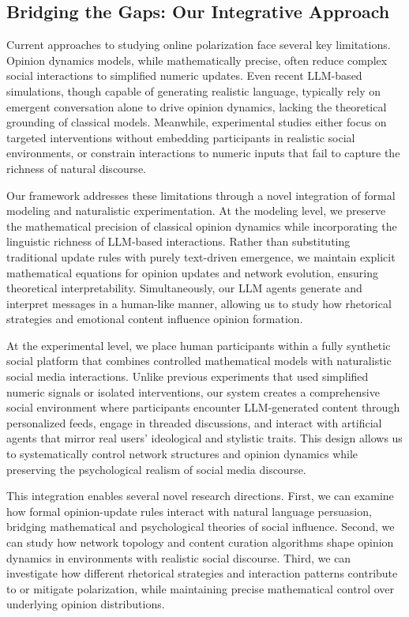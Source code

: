 \subsection{Bridging the Gaps: Our Integrative Approach}

Current approaches to studying online polarization face several key limitations. Opinion dynamics models, while mathematically precise, often reduce complex social interactions to simplified numeric updates. Even recent LLM-based simulations, though capable of generating realistic language, typically rely on emergent conversation alone to drive opinion dynamics, lacking the theoretical grounding of classical models. Meanwhile, experimental studies either focus on targeted interventions without embedding participants in realistic social environments, or constrain interactions to numeric inputs that fail to capture the richness of natural discourse.

Our framework addresses these limitations through a novel integration of formal modeling and naturalistic experimentation. At the modeling level, we preserve the mathematical precision of classical opinion dynamics while incorporating the linguistic richness of LLM-based interactions. Rather than substituting traditional update rules with purely text-driven emergence, we maintain explicit mathematical equations for opinion updates and network evolution, ensuring theoretical interpretability. Simultaneously, our LLM agents generate and interpret messages in a human-like manner, allowing us to study how rhetorical strategies and emotional content influence opinion formation.

At the experimental level, we place human participants within a fully synthetic social platform that combines controlled mathematical models with naturalistic social media interactions. Unlike previous experiments that used simplified numeric signals or isolated interventions, our system creates a comprehensive social environment where participants encounter LLM-generated content through personalized feeds, engage in threaded discussions, and interact with artificial agents that mirror real users' ideological and stylistic traits. This design allows us to systematically control network structures and opinion dynamics while preserving the psychological realism of social media discourse.

This integration enables several novel research directions. First, we can examine how formal opinion-update rules interact with natural language persuasion, bridging mathematical and psychological theories of social influence. Second, we can study how network topology and content curation algorithms shape opinion dynamics in environments with realistic social discourse. Third, we can investigate how different rhetorical strategies and interaction patterns contribute to or mitigate polarization, while maintaining precise mathematical control over underlying opinion distributions.


